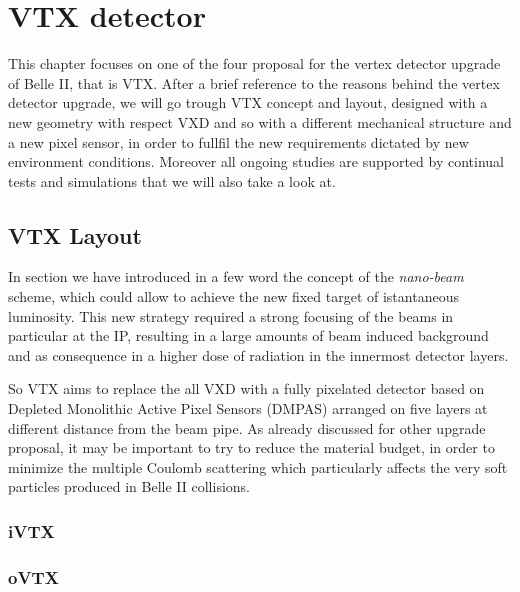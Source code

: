 \chapter{VTX detector}

This chapter focuses on one of the four proposal for the vertex detector upgrade of Belle II, that is VTX. After a brief reference to the reasons behind the vertex detector upgrade, we will go trough VTX concept and layout, designed with a new geometry with respect VXD and so with a different mechanical structure and a new pixel sensor, in order to fullfil the new requirements dictated by new environment conditions. Moreover all ongoing studies are supported by continual tests and simulations that we will also take a look at.


\section{VTX Layout}

In section  we have introduced in a few word the concept of the \textit{nano-beam} scheme, which could allow to achieve the new fixed target of istantaneous luminosity. This new strategy required a strong focusing of the beams in particular at the IP, resulting in a large amounts of beam induced background and as consequence in a higher dose of radiation in the innermost detector layers. 

So VTX aims to replace the all VXD with a fully pixelated detector based on Depleted Monolithic Active Pixel Sensors (DMPAS) arranged on five layers at different distance from the beam pipe. As already discussed for other upgrade proposal, it may be important to try to reduce the material budget, in order to minimize the multiple Coulomb scattering which particularly affects the very soft particles produced in Belle II collisions.

\subsection{iVTX}

\subsection{oVTX}


